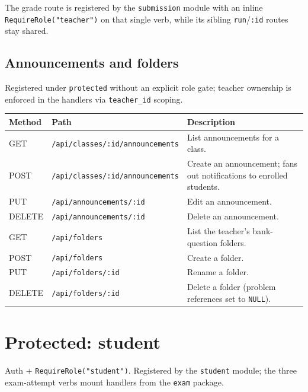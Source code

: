 The grade route is registered by the \texttt{submission} module with an inline \texttt{RequireRole("teacher")} on that single verb, while its sibling \texttt{run}/\texttt{:id} routes stay shared.

\subsection{Announcements and folders}

Registered under \texttt{protected} without an explicit role gate; teacher ownership is enforced in the handlers via \texttt{teacher\_id} scoping.

\begin{xltabular}{\linewidth}{l >{\ttfamily\small\raggedright\arraybackslash}p{5.7cm} X}
  \toprule
  Method & Path & Description \\
  \midrule
  GET    & \texttt{/api/classes/:id/announcements} & List announcements for a class. \\
  POST   & \texttt{/api/classes/:id/announcements} & Create an announcement; fans out notifications to enrolled students. \\
  PUT    & \texttt{/api/announcements/:id}         & Edit an announcement. \\
  DELETE & \texttt{/api/announcements/:id}         & Delete an announcement. \\
  GET    & \texttt{/api/folders}                   & List the teacher's bank-question folders. \\
  POST   & \texttt{/api/folders}                   & Create a folder. \\
  PUT    & \texttt{/api/folders/:id}               & Rename a folder. \\
  DELETE & \texttt{/api/folders/:id}               & Delete a folder (problem references set to \texttt{NULL}). \\
  \bottomrule
\end{xltabular}

\section{Protected: student}

Auth + \texttt{RequireRole("student")}. Registered by the \texttt{student} module; the three exam-attempt verbs mount handlers from the \texttt{exam} package.

